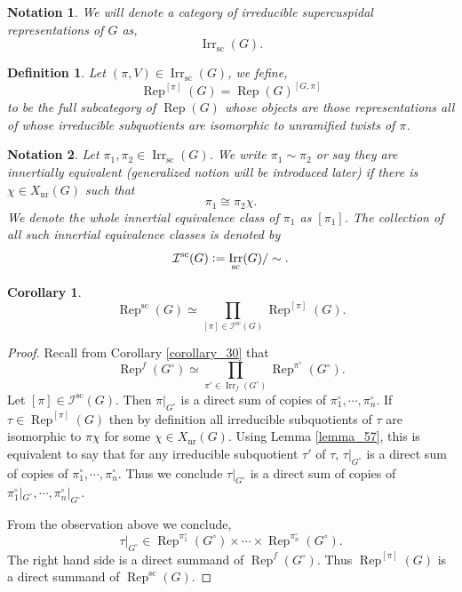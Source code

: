 \documentclass[8pt]{article}
\newtheorem{definition}{Definition}[section]
\newtheorem{notation}{Notation}[section]
\newtheorem{corollary}{Corollary} [section]
\DeclareMathOperator{\Rep}{Rep}
\DeclareMathOperator{\supcus}{sc}
\DeclareMathOperator{\Irr}{Irr}
\DeclareMathOperator{\nr}{nr}
\newcommand{\defeq}{\vcentcolon=}
\begin{document}
\begin{notation}
  We will denote a category of irreducible supercuspidal representations of $G$ as,
  \begin{equation*}
    \Irr_{\supcus}(G).
  \end{equation*}
\end{notation}
\begin{definition}
  Let $(\pi,V)\in\Irr_{\supcus}(G)$, we fefine, 
  \begin{equation*}
    \Rep^{[\pi]}(G) = \Rep(G)^{[G,\pi]}
  \end{equation*}
  to be the full subcategory of $\Rep(G)$ whose objects are those representations all of whose irreducible subquotients are isomorphic to unramified twists of $\pi$. 
\end{definition}\begin{notation}
  Let $\pi_1,\pi_2\in\Irr_{\supcus}(G)$. We write $\pi_1\sim\pi_2$ or say they are innertially equivalent (generalized notion will be introduced later) if there is $\chi\in X_{\nr}(G)$ such that 
  \begin{equation*}
    \pi_1\cong\pi_2\chi.
  \end{equation*}
  We denote the whole innertial equivalence class of $\pi_1$ as $[\pi_1]$. The collection of all such innertial equivalence classes is denoted by 
  \begin{equation*}
    \mathcal{I}^{\supcus}(G)\defeq \Irr_{\supcus}(G)/\sim.
  \end{equation*}
\end{notation}
\begin{corollary}
  \label{corollary_58}
  \begin{equation*}
    \Rep^{\supcus}(G)\simeq\prod_{[\pi]\in\mathcal{I}^{\supcus}(G)}\Rep^{[\pi]}(G).
  \end{equation*}
\end{corollary}
\begin{proof}
  Recall from Corollary \ref{corollary_30} that 
  \begin{equation*}
    \Rep^f(G^\circ) \simeq \prod_{\pi^\circ\in\Irr_f(G^\circ)}\Rep^{\pi^\circ}(G^\circ).
  \end{equation*}
  Let $[\pi]\in\mathcal{I}^{\supcus}(G)$. Then $\pi|_{G^\circ}$ is a direct sum of copies of $\pi_1^\circ,\cdots,\pi_n^\circ$. If $\tau\in\Rep^{[\pi]}(G)$ then by definition all irreducible subquotients of $\tau$ are isomorphic to $\pi\chi$ for some $\chi\in X_{\nr}(G)$.
  Using Lemma \ref{lemma_57}, this is equivalent to say that for any irreducible subquotient $\tau'$ of $\tau$, $\tau|_{G^\circ}$ is a direct sum of copies of $\pi_1^\circ,\cdots,\pi_n^\circ$. Thus we conclude $\tau|_{G^\circ}$ is a direct sum of copies of $\pi_1^\circ|_{G^\circ},\cdots,\pi_n^\circ|_{G^\circ}$. 
  \par From the observation above we conclude,
  \begin{equation*}
  \tau|_{G^\circ}\in\Rep^{\pi_1^\circ}(G^\circ)\times\cdots\times\Rep^{\pi_n^\circ}(G^\circ).
  \end{equation*}
  The right hand side is a direct summand of $\Rep^f(G^\circ)$. Thus $\Rep^{[\pi]}(G)$ is a direct summand of $\Rep^{\supcus}(G)$.
\end{proof}
\end{document}

